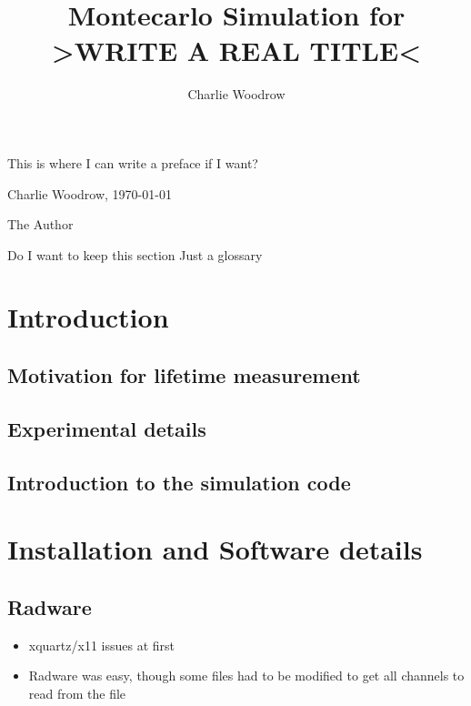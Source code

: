 \documentclass[utf8,bachelor,english,draft]{gradu3}
\begin{document}
\title{Montecarlo Simulation for >WRITE A REAL TITLE<}



\author{Charlie Woodrow}
\subject{in Physics}

\maketitle

\preface
This is where I can write a preface if I want?

Charlie Woodrow, \today

\bigskip

The Author

\begin{thetermlist}
\item[Do I want to keep this section] Just a glossary 
\end{thetermlist}

\mainmatter

\chapter{Introduction}
    \section{Motivation for lifetime measurement}
    \section{Experimental details}
    \section{Introduction to the simulation code}

\chapter{Installation and Software details}

    \section{Radware}
        \begin{itemize}
            \item xquartz/x11 issues at first
            \item Radware was easy, though some files had to be modified to get all channels to read from the file
        \end{itemize}
\end{document}
